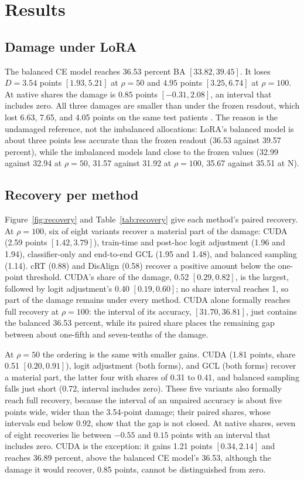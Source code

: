 \section{Results}
\label{sec:results}

\subsection{Damage under LoRA}
The balanced CE model reaches 36.53 percent BA $[33.82, 39.45]$. It loses $D=3.54$ points $[1.93, 5.21]$ at $\rho=50$ and $4.95$ points $[3.25, 6.74]$ at $\rho=100$. At native shares the damage is $0.85$ points $[-0.31, 2.08]$, an interval that includes zero. All three damages are smaller than under the frozen readout, which lost 6.63, 7.65, and 4.05 points on the same test patients \citep{queisler2026prevalenceBracs}. The reason is the undamaged reference, not the imbalanced allocations: LoRA's balanced model is about three points less accurate than the frozen readout (36.53 against 39.57 percent), while the imbalanced models land close to the frozen values (32.99 against 32.94 at $\rho=50$, 31.57 against 31.92 at $\rho=100$, 35.67 against 35.51 at N).

\subsection{Recovery per method}
Figure~\ref{fig:recovery} and Table~\ref{tab:recovery} give each method's paired recovery. At $\rho=100$, six of eight variants recover a material part of the damage: CUDA (2.59 points $[1.42, 3.79]$), train-time and post-hoc logit adjustment (1.96 and 1.94), classifier-only and end-to-end GCL (1.95 and 1.48), and balanced sampling (1.14). cRT (0.88) and DisAlign (0.58) recover a positive amount below the one-point threshold. CUDA's share of the damage, 0.52 $[0.29, 0.82]$, is the largest, followed by logit adjustment's 0.40 $[0.19, 0.60]$; no share interval reaches 1, so part of the damage remains under every method. CUDA alone formally reaches full recovery at $\rho=100$: the interval of its accuracy, $[31.70, 36.81]$, just contains the balanced 36.53 percent, while its paired share places the remaining gap between about one-fifth and seven-tenths of the damage.

At $\rho=50$ the ordering is the same with smaller gains. CUDA (1.81 points, share 0.51 $[0.20, 0.91]$), logit adjustment (both forms), and GCL (both forms) recover a material part, the latter four with shares of 0.31 to 0.41, and balanced sampling falls just short (0.72, interval includes zero). These five variants also formally reach full recovery, because the interval of an unpaired accuracy is about five points wide, wider than the 3.54-point damage; their paired shares, whose intervals end below 0.92, show that the gap is not closed. At native shares, seven of eight recoveries lie between $-0.55$ and $0.15$ points with an interval that includes zero. CUDA is the exception: it gains 1.21 points $[0.34, 2.14]$ and reaches 36.89 percent, above the balanced CE model's 36.53, although the damage it would recover, 0.85 points, cannot be distinguished from zero.

